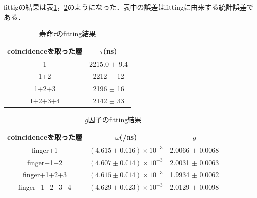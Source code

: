 fittigの結果は表\ref{fit_lt}，\ref{fit_g}のようになった．表中の誤差はfittingに由来する統計誤差である．

\begin{table}[H]
\caption{寿命$\tau$のfitting結果}
\label{fit_lt}
\begin{center}
\begin{tabular}{cc}\toprule
coincidenceを取った層 	& $\tau$(ns) \\ \midrule
1 			& 2215.0 $\pm$ 9.4 \\
1+2 			& 2212 $\pm$ 12 \\
1+2+3 			& 2196 $\pm$ 16 \\
1+2+3+4 		& 2142 $\pm$ 33 \\ \bottomrule
\end{tabular}
\end{center}
\end{table}%

\begin{table}[H]
\caption{$g$因子のfitting結果}
\label{fit_g}
\begin{center}
\begin{tabular}{ccc}\toprule
coincidenceを取った層 	& $\omega$(/ns) 			& $g$ \\ \midrule
finger+1 		& $( 4.615 \pm 0.016 ) \times 10^{-3}$ 	& 2.0066 $\pm$ 0.0068 \\
finger+1+2 		& $( 4.607 \pm 0.014 ) \times 10^{-3}$ 	& 2.0031 $\pm$ 0.0063 \\
finger+1+2+3 		& $( 4.615 \pm 0.014 ) \times 10^{-3}$ 	& 1.9934 $\pm$ 0.0062 \\
finger+1+2+3+4 		& $( 4.629 \pm 0.023 ) \times 10^{-3}$ 	& 2.0129 $\pm$ 0.0098 \\ \bottomrule
\end{tabular}
\end{center}
\end{table}%


